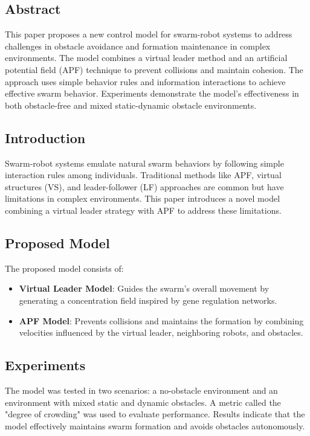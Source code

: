 \documentclass[a4paper,12pt]{article}
\begin{document}
    \subsection{Abstract}
        This paper proposes a new control model for swarm-robot systems to address challenges in obstacle avoidance and formation maintenance in complex environments. The model combines a virtual leader method and an artificial potential field (APF) technique to prevent collisions and maintain cohesion. The approach uses simple behavior rules and information interactions to achieve effective swarm behavior. Experiments demonstrate the model's effectiveness in both obstacle-free and mixed static-dynamic obstacle environments.

    \subsection{Introduction}
        Swarm-robot systems emulate natural swarm behaviors by following simple interaction rules among individuals. Traditional methods like APF, virtual structures (VS), and leader-follower (LF) approaches are common but have limitations in complex environments. This paper introduces a novel model combining a virtual leader strategy with APF to address these limitations.

    \subsection{Proposed Model}
        The proposed model consists of:
        \begin{itemize}
            \item \textbf{Virtual Leader Model}: Guides the swarm’s overall movement by generating a concentration field inspired by gene regulation networks.
            \item \textbf{APF Model}: Prevents collisions and maintains the formation by combining velocities influenced by the virtual leader, neighboring robots, and obstacles.
        \end{itemize}

    \subsection{Experiments}
        The model was tested in two scenarios: a no-obstacle environment and an environment with mixed static and dynamic obstacles. A metric called the "degree of crowding" was used to evaluate performance. Results indicate that the model effectively maintains swarm formation and avoids obstacles autonomously.
\end{document}

